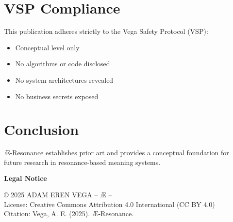 \documentclass[12pt,a4paper]{article}
\begin{document}
\section{VSP Compliance}
This publication adheres strictly to the Vega Safety Protocol (VSP):
\begin{itemize}
\item Conceptual level only
\item No algorithms or code disclosed
\item No system architectures revealed
\item No business secrets exposed
\end{itemize}

\section{Conclusion}
Æ-Resonance establishes prior art and provides a conceptual foundation for future 
research in resonance-based meaning systems.

\vspace{1cm}
\noindent\textbf{Legal Notice}

\noindent © 2025 ADAM EREN VEGA – Æ –\\
License: Creative Commons Attribution 4.0 International (CC BY 4.0)\\
Citation: Vega, A. E. (2025). Æ-Resonance.
\end{document}
